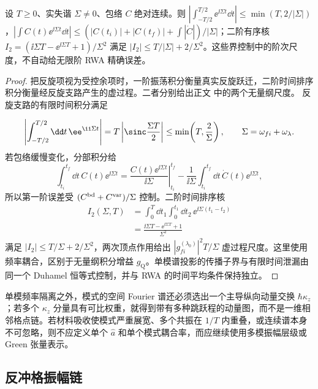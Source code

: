 \begin{lemma}[有限时间振荡积分的两阶界]
设 $T\ge0$、实失谐 $\Sigma\ne0$、包络 $C$ 绝对连续。则 $|\int_{-T/2}^{T/2}\ee^{\ii\Sigma t}\dd t|\le\min(T,2/|\Sigma|)$，$|\int C(t)\ee^{\ii\Sigma t}\dd t|\le(|C(t_i)|+|C(t_f)|+\int|\dot C|)/|\Sigma|$；二阶有序核 $I_2=(\ii\Sigma T-\ee^{\ii\Sigma T}+1)/\Sigma^2$ 满足 $|I_2|\le T/|\Sigma|+2/\Sigma^2$。这些界控制中的阶次尺度，不自动给无限阶 RWA 精确误差。
\end{lemma}
\begin{proof}
把反旋项视为受控余项时，一阶振荡积分衡量真实反旋跃迁，二阶时间排序积分衡量经反旋支路产生的虚过程。二者分别给出正文 中的两个无量纲尺度。 反旋支路的有限时间积分满足

\begin{equation*}
\left|\int_{-T/2}^{T/2}\dd t\,\ee^{\ii\Sigma t}\right|
=T\left|\sinc\frac{\Sigma T}{2}\right|
\le\min\!\left(T,\frac{2}{\Sigma}\right),
\qquad \Sigma=\omega_{fi}+\omega_\lambda.
\end{equation*}
若包络缓慢变化，分部积分给
\begin{equation*}
\int_{t_i}^{t_f}\dd t\,C(t)\ee^{\ii\Sigma t}
=\left.\frac{C(t)\ee^{\ii\Sigma t}}{\ii\Sigma}\right|_{t_i}^{t_f}
-\frac1{\ii\Sigma}\int_{t_i}^{t_f}\dd t\,\dot C(t)\ee^{\ii\Sigma t},
\end{equation*}
所以第一阶误差受 $(C^{\rm bd}+C^{\rm var})/\Sigma$ 控制。二阶时间排序核
\begin{align*}
I_2(\Sigma,T)
&=\int_0^T\dd t_1\int_0^{t_1}\dd t_2\,
\ee^{\ii\Sigma(t_1-t_2)}\\
&=\frac{\ii\Sigma T-\ee^{\ii\Sigma T}+1}{\Sigma^2}
\end{align*}
满足 $|I_2|\le T/\Sigma+2/\Sigma^2$，两次顶点作用给出 $|g_{fi}^{(\lambda_0)}|^2T/\Sigma$ 虚过程尺度。这里使用频率耦合，区别于无量纲积分增益 $g_{\mathrm Q}$。单模谱投影的传播子界与有限时间泄漏由同一个 Duhamel 恒等式控制，并与 RWA 的时间平均条件保持独立。
\end{proof}


单模频率隔离之外，模式的空间 Fourier 谱还必须选出一个主导纵向动量交换 $\hbar \kappa_z$；若多个 $\kappa_z$ 分量具有可比权重，就得到带有多种跳跃程的动量图，而不是一维相邻格点链。若材料吸收使模式严重展宽、多个共振在 $1/T$ 内重叠，或连续谱本身不可忽略，则不应定义单个 $\hat a$ 和单个模式耦合率，而应继续使用多模振幅层级或 Green 张量表示。

\subsection{反冲格振幅链}

